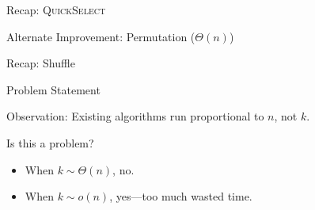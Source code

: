 \begin{frame}{Recap: \textsc{QuickSelect}}
  \begin{algorithm}[H]
  \caption{Quick Select}
  \begin{algorithmic}


  \end{algorithmic}
  \end{algorithm}
\end{frame}

\begin{frame}{Alternate Improvement: Permutation (\(\Theta(n)\))}
  \begin{algorithm}[H]
  \caption{Permutation Sampling}
  \begin{algorithmic}

  \end{algorithmic}
  \end{algorithm}
\end{frame}

\begin{frame}{Recap: Shuffle}
  \begin{algorithm}[H]
  \caption{Shuffling via Fisher-Yates}
  \begin{algorithmic}

    \EndFor
  \end{algorithmic}
  \end{algorithm}
\end{frame}

\begin{frame}{Problem Statement}
  \begin{center}
    Observation: Existing algorithms run proportional to \(n\),
    not \(k\).
  \end{center}

  Is this a problem?
  \begin{itemize}
    \item When \(k \sim \Theta(n)\), no.
    \item When \(k \sim o(n)\), yes---too much wasted time.
  \end{itemize}
\end{frame}

